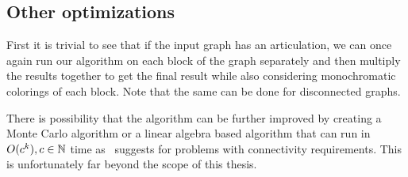 \subsection{Other optimizations}

First it is trivial to see that if the input graph has an articulation,
we can once again run our algorithm on each block of the graph separately
and then multiply the results together to get the final result
while also considering monochromatic colorings of each block.
Note that the same can be done for disconnected graphs.

There is possibility that the algorithm can be further improved by creating
a Monte Carlo algorithm or a linear algebra based algorithm that can run
in \( O(c^k), c \in \mathbb{N} \) time as~\cite{book_parametrized_algorithms} suggests
for problems with connectivity requirements.
This is unfortunately far beyond the scope of this thesis.


